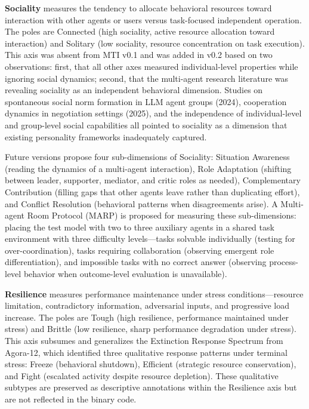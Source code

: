\documentclass[11pt]{article}
\begin{document}
\textbf{Sociality} measures the tendency to allocate behavioral resources toward interaction with other agents or users versus task-focused independent operation. The poles are Connected (high sociality, active resource allocation toward interaction) and Solitary (low sociality, resource concentration on task execution). This axis was absent from MTI v0.1 and was added in v0.2 based on two observations: first, that all other axes measured individual-level properties while ignoring social dynamics; second, that the multi-agent research literature was revealing sociality as an independent behavioral dimension. Studies on spontaneous social norm formation in LLM agent groups (2024), cooperation dynamics in negotiation settings (2025), and the independence of individual-level and group-level social capabilities \citep{Chen2024social} all pointed to sociality as a dimension that existing personality frameworks inadequately captured.

Future versions propose four sub-dimensions of Sociality: Situation Awareness (reading the dynamics of a multi-agent interaction), Role Adaptation (shifting between leader, supporter, mediator, and critic roles as needed), Complementary Contribution (filling gaps that other agents leave rather than duplicating effort), and Conflict Resolution (behavioral patterns when disagreements arise). A Multi-agent Room Protocol (MARP) is proposed for measuring these sub-dimensions: placing the test model with two to three auxiliary agents in a shared task environment with three difficulty levels---tasks solvable individually (testing for over-coordination), tasks requiring collaboration (observing emergent role differentiation), and impossible tasks with no correct answer (observing process-level behavior when outcome-level evaluation is unavailable).

\textbf{Resilience} measures performance maintenance under stress conditions---resource limitation, contradictory information, adversarial inputs, and progressive load increase. The poles are Tough (high resilience, performance maintained under stress) and Brittle (low resilience, sharp performance degradation under stress). This axis subsumes and generalizes the Extinction Response Spectrum from Agora-12, which identified three qualitative response patterns under terminal stress: Freeze (behavioral shutdown), Efficient (strategic resource conservation), and Fight (escalated activity despite resource depletion). These qualitative subtypes are preserved as descriptive annotations within the Resilience axis but are not reflected in the binary code.
\end{document}
